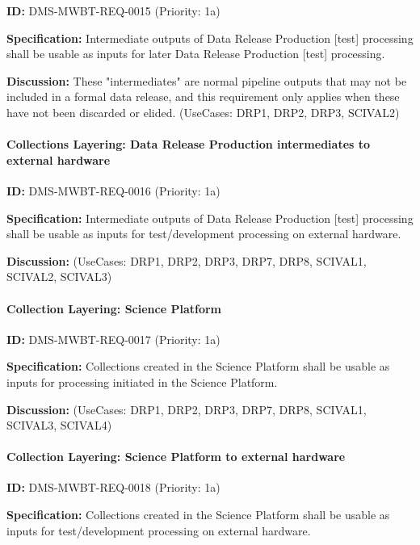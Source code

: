 \documentclass[SE,toc,lsstdraft]{lsstdoc}
\begin{document}
\label{DMS-MWBT-REQ-0015}
\textbf{ID:} DMS-MWBT-REQ-0015 (Priority: 1a)

\textbf{Specification:}
Intermediate outputs of Data Release Production [test] processing shall be usable as inputs for later Data Release Production [test] processing.

\textbf{Discussion:}
These "intermediates" are normal pipeline outputs that may not be included in a formal data release, and this requirement only applies when these have not been discarded or elided. (UseCases: DRP1, DRP2, DRP3, SCIVAL2)

\paragraph{Collections Layering: Data Release Production intermediates to external hardware}\hfill  %

\label{DMS-MWBT-REQ-0016}
\textbf{ID:} DMS-MWBT-REQ-0016 (Priority: 1a)

\textbf{Specification:}
Intermediate outputs of Data Release Production [test] processing shall be usable as inputs for test/development processing on external hardware.

\textbf{Discussion:}
(UseCases: DRP1, DRP2, DRP3, DRP7, DRP8, SCIVAL1, SCIVAL2, SCIVAL3)

\paragraph{Collection Layering: Science Platform}\hfill  %

\label{DMS-MWBT-REQ-0017}
\textbf{ID:} DMS-MWBT-REQ-0017 (Priority: 1a)

\textbf{Specification:}
Collections created in the Science Platform shall be usable as inputs for processing initiated in the Science Platform.

\textbf{Discussion:}
(UseCases: DRP1, DRP2, DRP3, DRP7, DRP8, SCIVAL1, SCIVAL3, SCIVAL4)

\paragraph{Collection Layering: Science Platform to external hardware}\hfill  %

\label{DMS-MWBT-REQ-0018}
\textbf{ID:} DMS-MWBT-REQ-0018 (Priority: 1a)

\textbf{Specification:}
Collections created in the Science Platform shall be usable as inputs for test/development processing on external hardware.
\end{document}
